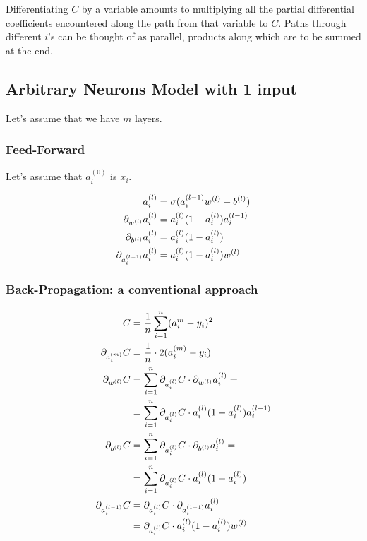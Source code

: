 \documentclass{article}
\begin{document}
Differentiating $C$ by a variable amounts to multiplying all the partial differential coefficients encountered along the path from that variable to $C$. Paths through different $i$'s can be thought of as parallel, products along which are to be summed at the end.

\subsection{Arbitrary Neurons Model with 1 input}

Let's assume that we have $m$ layers.

\subsubsection{Feed-Forward}

Let's assume that $a_i^{(0)}$ is $x_i$.

\begin{align}
  a_i^{(l)} &= \sigma(a_i^{(l-1)}w^{(l)} + b^{(l)}) \\
  \pd[w^{(l)}]a_i^{(l)} &= a_i^{(l)}(1 - a_i^{(l)})a_i^{(l-1)} \\
  \pd[b^{(l)}]a_i^{(l)} &= a_i^{(l)}(1 - a_i^{(l)}) \\
  \pd[a_i^{(l-1)}]a_i^{(l)} &= a_i^{(l)}(1 - a_i^{(l)})w^{(l)}
\end{align}

\subsubsection{Back-Propagation: a conventional approach}

\begin{align}
  C &= \avgsum[i, n] (a_i^m - y_i)^2 \\
  \pd[a_i^{(m)}] C &= \frac{1}{n} \cdot 2(a_i^{(m)} - y_i) \\
  \pd[w^{(l)}] C
        &= \sum_{i=1}^n \pd[a_i^{(l)}] C \cdot \pd[w^{(l)}] a_i^{(l)} = \\
        &= \sum_{i=1}^n \pd[a_i^{(l)}] C \cdot a_i^{(l)}(1 - a_i^{(l)})a_i^{(l-1)} \\
  \pd[b^{(l)}] C
        &= \sum_{i=1}^n \pd[a_i^{(l)}] C \cdot \pd[b^{(l)}] a_i^{(l)} = \\
        &= \sum_{i=1}^n \pd[a_i^{(l)}] C \cdot a_i^{(l)}(1 - a_i^{(l)}) \\
  \pd[a_i^{(l-1)}] C
        &= \pd[a_i^{(l)}] C \cdot \pd[a_i^{(1-1)}] a_i^{(l)} \\
        &= \pd[a_i^{(l)}] C \cdot a_i^{(l)}(1 - a_i^{(l)})w^{(l)}
\end{align}
\end{document}
